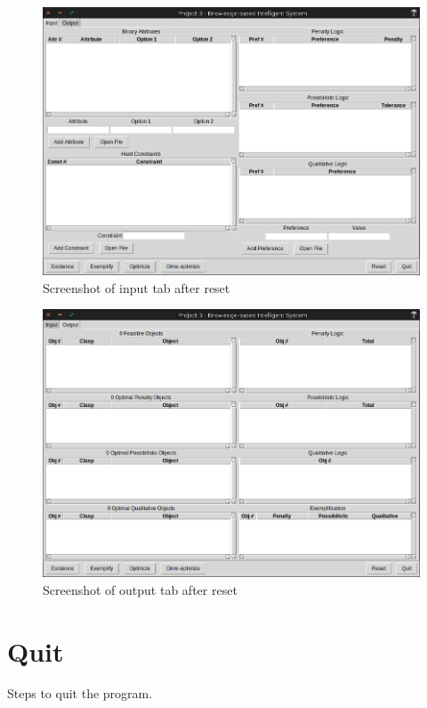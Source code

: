 \documentclass[12pt]{report}
\begin{document}
\begin{multicols}{2}
\begin{figure}[H]
\begin{center}
\includegraphics[scale=0.25,trim=1cm 1cm 1cm 1cm]{input_start}
\caption{Screenshot of input tab after reset}
\end{center}
\end{figure}
\begin{figure}[H]
\begin{center}
\includegraphics[scale=0.25,trim=1cm 1cm 1cm 1cm]{output_start}
\caption{Screenshot of output tab after reset}
\end{center}
\end{figure}
\end{multicols}

\newpage
\chapter{Quit}
Steps to quit the program.\\
\end{document}
